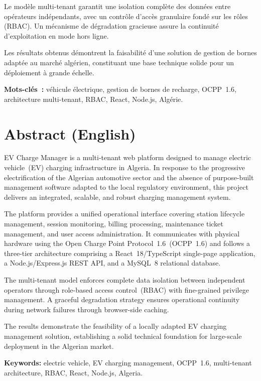 \documentclass[12pt,a4paper]{report}
\begin{document}
Le modèle multi-tenant garantit une isolation complète des données entre opérateurs
indépendants, avec un contrôle d'accès granulaire fondé sur les rôles (RBAC). Un mécanisme
de dégradation gracieuse assure la continuité d'exploitation en mode hors ligne.

Les résultats obtenus démontrent la faisabilité d'une solution de gestion de bornes adaptée
au marché algérien, constituant une base technique solide pour un déploiement à grande échelle.

\medskip
\noindent\textbf{Mots-clés~:} véhicule électrique, gestion de bornes de recharge, OCPP~1.6,
architecture multi-tenant, RBAC, React, Node.js, Algérie.

\bigskip
\section*{Abstract (English)}

EV Charge Manager is a multi-tenant web platform designed to manage electric vehicle~(EV)
charging infrastructure in Algeria. In response to the progressive electrification of the
Algerian automotive sector and the absence of purpose-built management software adapted to
the local regulatory environment, this project delivers an integrated, scalable, and robust
charging management system.

The platform provides a unified operational interface covering station lifecycle management,
session monitoring, billing processing, maintenance ticket management, and user access
administration. It communicates with physical hardware using the Open Charge Point
Protocol~1.6~(OCPP~1.6) and follows a three-tier architecture comprising a React~18/TypeScript
single-page application, a Node.js/Express.js REST API, and a MySQL~8 relational database.

The multi-tenant model enforces complete data isolation between independent operators through
role-based access control~(RBAC) with fine-grained privilege management. A graceful degradation
strategy ensures operational continuity during network failures through browser-side caching.

The results demonstrate the feasibility of a locally adapted EV charging management solution,
establishing a solid technical foundation for large-scale deployment in the Algerian market.

\medskip
\noindent\textbf{Keywords:} electric vehicle, EV charging management, OCPP~1.6, multi-tenant
architecture, RBAC, React, Node.js, Algeria.
\end{document}

